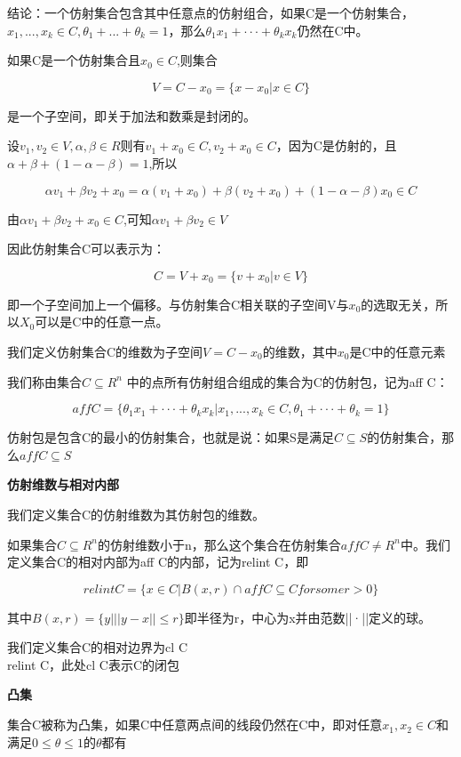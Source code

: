 \documentclass{ctexart}
\begin{document}
	结论：一个仿射集合包含其中任意点的仿射组合，如果C是一个仿射集合，\(x_1,...,x_k \in C, \theta_1 + ... + \theta_k = 1\)，那么\(\theta_1 x_1 + ··· +\theta_k x_k\)仍然在C中。
	
	如果C是一个仿射集合且\(x_0 \in C\),则集合
	
	\[V = C-x_0 = \{x-x_0|x\in C\}\]
	
	是一个子空间，即关于加法和数乘是封闭的。
	
	设\(v_1,v_2 \in V, \alpha, \beta \in R\)则有\(v_1 + x_0 \in C, v_2 + x_0 \in C\)，因为C是仿射的，且\(\alpha + \beta + (1-\alpha - \beta) = 1\),所以
	
	\[\alpha v_1 + \beta v_2 + x_0 = \alpha(v_1 + x_0) + \beta(v_2 + x_0) + (1-\alpha - \beta)x_0 \in C\]
	
	由\(\alpha v_1 + \beta v_2 + x_0 \in C\),可知\(\alpha v_1 + \beta v_2 \in V\)
	
	因此仿射集合C可以表示为：
	
	\[C = V + x_0 = \{v + x_0|v \in V\}\]
	
	即一个子空间加上一个偏移。与仿射集合C相关联的子空间V与\(x_0\)的选取无关，所以\(X_0\)可以是C中的任意一点。
	
	我们定义仿射集合C的维数为子空间\(V = C - x_0\)的维数，其中\(x_0\)是C中的任意元素
	
	我们称由集合\(C \subseteq R^n\) 中的点所有仿射组合组成的集合为C的仿射包，记为aff C：
	
	\[aff C = \{\theta_1 x_1+ ··· + \theta_k x_k|x_1,...,x_k \in C, \theta_1+···+\theta_k=1\}\]
	
	仿射包是包含C的最小的仿射集合，也就是说：如果S是满足\(C \subseteq S\)的仿射集合，那么\(aff C \subseteq S\)
	
	\textbf{仿射维数与相对内部}
	
	我们定义集合C的仿射维数为其仿射包的维数。
	
	如果集合\(C \subseteq R^n\)的仿射维数小于n，那么这个集合在仿射集合\(aff C \neq R^n\)中。我们定义集合C的相对内部为aff C的内部，记为relint C，即
	
	\[relint C = \{x \in C|B(x, r) \cap aff C \subseteq C for  some  r > 0\}\]
	
	其中\(B(x, r) = \{y| ||y-x|| \leq r\}\)即半径为r，中心为x并由范数||·||定义的球。
	
	我们定义集合C的相对边界为cl C\\relint C，此处cl C表示C的闭包
	
	\textbf{凸集}
	
	集合C被称为凸集，如果C中任意两点间的{\color{red}线段}仍然在C中，即对任意\(x_1, x_2 \in C\)和满足\(0 \leq \theta \leq 1\)的\(\theta\)都有
	
\end{document}
